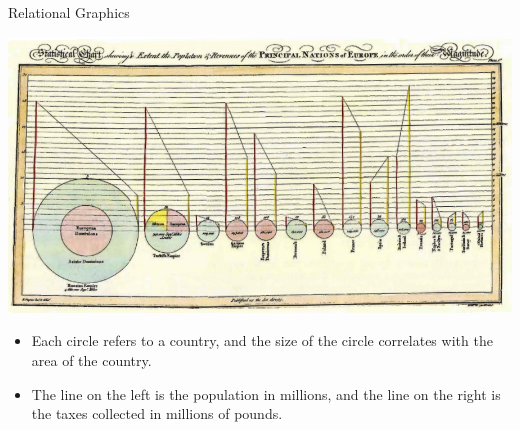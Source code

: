 \documentclass[
  ignorenonframetext,
]{beamer}
\begin{document}
\begin{frame}{Relational Graphics}
\protect\hypertarget{relational-graphics-1}{}
\begin{minipage}{1\textwidth}
\centering
\includegraphics[width=\textwidth]{excellence_figs/fig_24.png}
\end{minipage}
\hfill \vspace{3mm}
\begin{minipage}{1\textwidth}
\footnotesize
\begin{itemize}
  \item Each circle refers to a country, and the size of the circle correlates with the area of the country.
  \item The line on the left is the population in millions, and the line on the right is the taxes collected in millions of pounds.
\end{itemize}
\end{minipage}
\end{frame}
\end{document}
